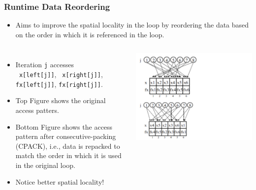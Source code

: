\documentclass{beamer}
\newcommand{\emp}[1]{\textcolor{DikuRed}{ #1}}
\newcommand{\emphh}[1]{\textcolor{CosGreen}{ #1}}
\begin{document}
\begin{frame}[fragile,t]
  \frametitle{Runtime Data Reordering}

\begin{itemize}
    \item Aims to improve the \emphh{spatial locality} in the loop
            by reordering the data based on the order in which it is
            referenced in the loop.
\end  {itemize}


\begin{columns}
\begin{itemize}
    \item Iteration {\tt j} accesses\\{\tt~x[left[j]]}, {\tt~x[right[j]]}, 
                                     {\tt fx[left[j]]}, {\tt fx[right[j]]}.
    \item Top Figure shows the original access patters.
    \item Bottom Figure shows the access pattern after consecutive-packing (CPACK), 
            i.e., data is repacked to match the order
            in which it is used in the original loop.
    \item \emp{Notice better spatial locality!}
\end  {itemize}
\includegraphics[width=53ex]{Figures/DataReordering1}
\end{columns}
 
\end{frame}
\end{document}
